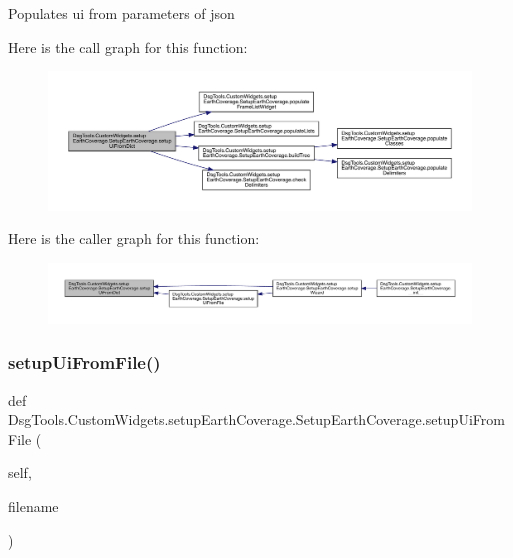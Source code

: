 \begin{DoxyVerb}Populates ui from parameters of json
\end{DoxyVerb}
 Here is the call graph for this function\+:
\nopagebreak
\begin{figure}[H]
\begin{center}
\leavevmode
\includegraphics[width=350pt]{class_dsg_tools_1_1_custom_widgets_1_1setup_earth_coverage_1_1_setup_earth_coverage_a52b6b311cf997811b741f9cd700cad79_cgraph}
\end{center}
\end{figure}
Here is the caller graph for this function\+:
\nopagebreak
\begin{figure}[H]
\begin{center}
\leavevmode
\includegraphics[width=350pt]{class_dsg_tools_1_1_custom_widgets_1_1setup_earth_coverage_1_1_setup_earth_coverage_a52b6b311cf997811b741f9cd700cad79_icgraph}
\end{center}
\end{figure}
\mbox{\label{class_dsg_tools_1_1_custom_widgets_1_1setup_earth_coverage_1_1_setup_earth_coverage_aa2bfcb725f3e9c36d4df890ae7656879}} 
\subsubsection{\texorpdfstring{setup\+Ui\+From\+File()}{setupUiFromFile()}}
{\footnotesize\ttfamily def Dsg\+Tools.\+Custom\+Widgets.\+setup\+Earth\+Coverage.\+Setup\+Earth\+Coverage.\+setup\+Ui\+From\+File (\begin{DoxyParamCaption}\item[{}]{self,  }\item[{}]{filename }\end{DoxyParamCaption})}

